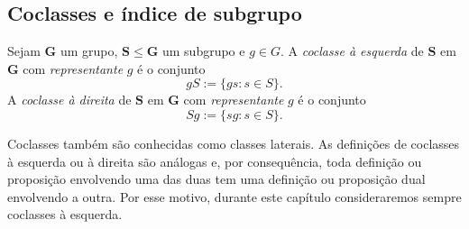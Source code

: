 \begin{comment}

\begin{definition}
Sejam $\bm G$ um grupo e $g \in G$. A \emph{conjugação} por $g$ é a função
	\begin{align*}
	\func{\con{g}}{G}{G}{h}{ghg\inv}.
	\end{align*}
A \emph{translação à direita} por $g$ é a função
	\begin{align*}
	\func{\trD{g}}{G}{G}{h}{hg}.
	\end{align*}
A \emph{translação à esquerda} por $g$ é a função
	\begin{align*}
	\func{\trE{g}}{G}{G}{h}{gh}.
	\end{align*}
\end{definition}

\end{comment}

\subsection{Coclasses e índice de subgrupo}

\begin{definition}
Sejam $\bm G$ um grupo, $\bm S \leq \bm G$ um subgrupo e $g \in G$. A \emph{coclasse à esquerda} de $\bm S$ em $\bm G$ com \emph{representante} $g$ é o conjunto
	\begin{equation*}
	gS := \{gs:s \in S\}.
	\end{equation*}
A \emph{coclasse à direita} de $\bm S$ em $\bm G$ com \emph{representante} $g$ é o conjunto
	\begin{equation*}
	Sg := \{sg:s \in S\}.
	\end{equation*}
\end{definition}

Coclasses também são conhecidas como classes laterais. As definições de coclasses à esquerda ou à direita são análogas e, por consequência, toda definição ou proposição envolvendo uma das duas tem uma definição ou proposição dual envolvendo a outra. Por esse motivo, durante este capítulo consideraremos sempre coclasses à esquerda.

